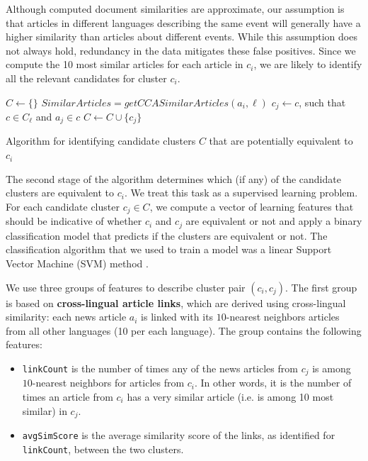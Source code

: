 \documentclass[twoside,11pt]{article}
\begin{document}
Although computed document similarities are approximate, our  assumption is that articles in different languages describing the same event will generally have a higher similarity than articles about different events. While this assumption does not always hold, redundancy in the data mitigates these false positives. Since we compute the 10 most similar articles for each article in $c_i$, we are likely to identify all the relevant candidates for cluster $c_i$.

\begin{algorithm}[t!]
$C \leftarrow \{\}$\;
 {
     {
        $SimilarArticles = getCCASimilarArticles(a_i, \ell)$\;
         {
            $c_j \leftarrow c$, such that $c \in C_\ell$ and $a_j \in c$\;
            $C \leftarrow C \cup \{ c_j \}$\;
        }
    }
}
\caption{Algorithm for identifying candidate clusters $C$ that are potentially equivalent to $c_i$}
\label{cluster_merge_algo1}
\end{algorithm}

The second stage of the algorithm determines which (if any) of the candidate clusters are equivalent to $c_i$. We treat this task as a supervised learning problem. For each candidate cluster $c_j \in C$, we compute a vector of learning features that should be indicative of whether $c_i$ and $c_j$ are equivalent or not and apply a binary classification model that predicts if the clusters are equivalent or not. The classification algorithm that we used to train a model was a linear Support Vector Machine (SVM) method .

We use three groups of features to describe cluster pair $(c_i, c_j)$. The first group is based on {\bf cross-lingual article links}, which are derived using cross-lingual similarity: each news article $a_i$ is linked with its $10$-nearest neighbors articles from all other languages (10 per each language). The group contains the following features:

\begin{itemize}
\item \texttt{linkCount} is the number of times any of the news articles from $c_j$ is among $10$-nearest neighbors for articles from $c_i$. In other words, it is the number of times an article from $c_i$ has a very similar article (i.e. is among 10 most similar) in $c_j$.
\item \texttt{avgSimScore} is the average similarity score of the links, as identified for \texttt{linkCount}, between the two clusters.
\end{itemize}
\end{document}
